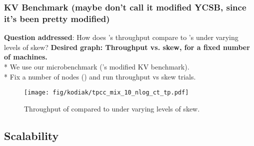 \subsubsection{KV Benchmark (maybe don't call it modified YCSB, since it's been pretty modified)}
\label{sec:kv}
\textbf{Question addressed}: How does \name{}'s throughput compare to \dsdb{}'s under varying levels of skew?
\textbf{Desired graph: Throughput vs. skew, for a fixed number of machines.}\\
* We use our microbenchmark (\dsdb{}'s modified KV benchmark).\\
* Fix a number of nodes () and run throughput vs skew trials.\\

\begin{figure}[t]
  \texttt{[image: fig/kodiak/tpcc\_mix\_10\_nlog\_ct\_tp.pdf]}
  \caption{Throughput of \name{} compared to \dsdb{} under varying levels of skew.}
  \label{fig:kv_normal}
\end{figure}

\subsection{Scalability}
\label{sec:scale}

